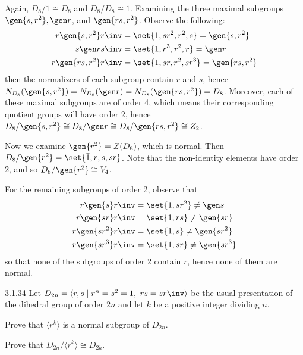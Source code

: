 \begin{sol}
    Again, $D_8/1 \cong D_8$ and $D_8/D_8 \cong 1$.
	Examining the three maximal subgroups $\gen{s, r^2}, \gen r$, and $\gen{rs, r^2}$.
	Observe the following:
    \begin{align*}
        r\gen{s, r^2}r\inv & = \set{1, sr^2, r^2, s} = \gen{s, r^2} \\
        s\gen r s\inv & = \set{1, r^3, r^2, r} = \gen r \\
        r\gen{rs, r^2}r\inv & = \set{1, sr, r^2, sr^3} = \gen{rs, r^2}
    \end{align*}
    then the normalizers of each subgroup contain $r$ and $s$, hence $N_{D_8}(\gen{s, r^2}) = N_{D_8}(\gen r) = N_{D_8}(\gen{rs, r^2}) = D_8$.
	Moreover, each of these maximal subgroups are of order 4, which means their corresponding quotient groups will have order 2, hence $D_8/\gen{s, r^2} \cong D_8/\gen r \cong D_8/\gen{rs, r^2} \cong Z_2$.

    Now we examine $\gen{r^2} = Z(D_8)$, which is normal.
	Then $D_8/\gen{r^2} = \set{\bar 1, \bar r, \bar s, \bar{sr}}$.
	Note that the non-identity elements have order 2, and so $D_8/\gen{r^2} \cong V_4$.

    For the remaining subgroups of order 2, observe that
    \begin{align*}
        r\gen{s}r\inv & = \set{1, sr^2} \neq \gen s \\
        r\gen{sr}r\inv & = \set{1, rs} \neq \gen{sr} \\
        r\gen{sr^2}r\inv & = \set{1, s} \neq \gen{sr^2} \\
        r\gen{sr^3}r\inv & = \set{1, sr} \neq \gen{sr^3}
    \end{align*}
    so that none of the subgroups of order 2 contain $r$, hence none of them are normal.
\end{sol}

\begin{exercise}{3.1.34} 
    Let $D_{2n} = \langle r,s \mid r^n = s^2 = 1,\ rs = sr\inv  \rangle$ be the usual presentation of the dihedral group of order $2n$ and let $k$ be a positive integer dividing $n$.
    \begin{subexercises}
        \item Prove that $\langle r^k \rangle$ is a normal subgroup of $D_{2n}$.
        \item Prove that $D_{2n}/\langle r^k \rangle \cong D_{2k}$.
    \end{subexercises}
\end{exercise}

